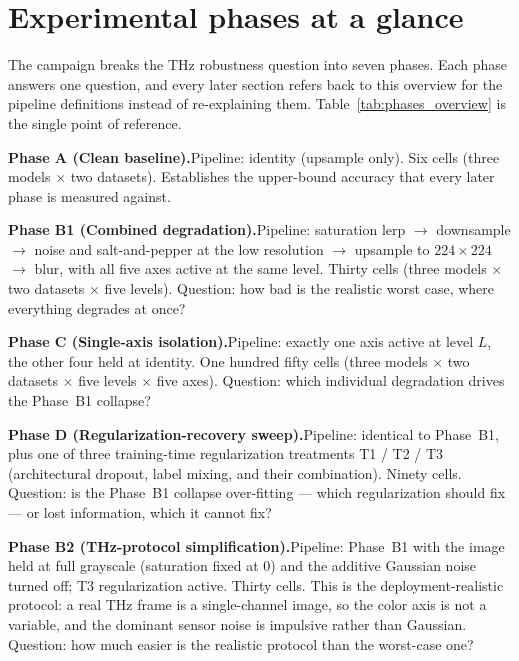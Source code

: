 \section{Experimental phases at a glance}
\label{sec:phases}

The campaign breaks the THz robustness question into seven phases. Each phase
answers one question, and every later section refers back to this overview
for the pipeline definitions instead of re-explaining them.
Table~\ref{tab:phases_overview} is the single point of reference.

\textbf{Phase A (Clean baseline).}\quad Pipeline: identity (upsample only).
Six cells (three models $\times$ two datasets). Establishes the upper-bound
accuracy that every later phase is measured against.

\textbf{Phase B1 (Combined degradation).}\quad Pipeline: saturation lerp
$\rightarrow$ downsample $\rightarrow$ noise and salt-and-pepper at the low
resolution $\rightarrow$ upsample to $224 \times 224$ $\rightarrow$ blur,
with all five axes active at the same level. Thirty cells (three models
$\times$ two datasets $\times$ five levels). Question: how bad is the
realistic worst case, where everything degrades at once?

\textbf{Phase C (Single-axis isolation).}\quad Pipeline: exactly one axis
active at level $L$, the other four held at identity. One hundred fifty cells
(three models $\times$ two datasets $\times$ five levels $\times$ five axes).
Question: which individual degradation drives the Phase~B1 collapse?

\textbf{Phase D (Regularization-recovery sweep).}\quad Pipeline: identical to
Phase~B1, plus one of three training-time regularization treatments T1 / T2 /
T3 (architectural dropout, label mixing, and their combination). Ninety cells.
Question: is the Phase~B1 collapse over-fitting --- which regularization
should fix --- or lost information, which it cannot fix?

\textbf{Phase B2 (THz-protocol simplification).}\quad Pipeline: Phase~B1 with
the image held at full grayscale (saturation fixed at 0) and the additive
Gaussian noise turned off; T3 regularization active. Thirty cells. This is
the deployment-realistic protocol: a real THz frame is a single-channel
image, so the color axis is not a variable, and the dominant sensor noise is
impulsive rather than Gaussian. Question: how much easier is the realistic
protocol than the worst-case one?

